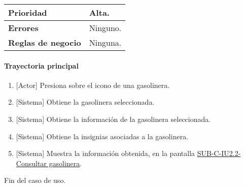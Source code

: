 \begin{longtable}{|J{5cm}|J{10.3cm}|}
	\textbf{Prioridad} & 
		Alta. \\ \hline
	\textbf{Errores} & Ninguno.
		\\ \hline
	\textbf{Reglas de negocio} & Ninguna.
		 \\ \hline
\end{longtable}

\paragraph{Trayectoria principal}
	\begin{enumerate}
		\item {[Actor]} Presiona sobre el icono de una gasolinera.
		\item {[Sistema]} Obtiene la gasolinera seleccionada.
		\item {[Sistema]} Obtiene la información de la gasolinera seleccionada.
		\item {[Sistema]} Obtiene la insignias asociadas a la gasolinera.
		\item {[Sistema]} Muestra la información obtenida, en la pantalla \hyperref[fig:sub-c-iu2.2]{SUB-C-IU2.2-Consultar gasolinera}.
	\end{enumerate}
	Fin del caso de uso.

